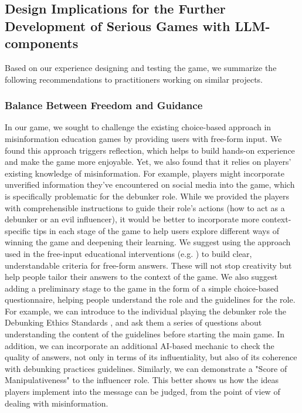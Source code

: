 
\subsection{Design Implications for the Further Development of Serious Games with LLM-components}
Based on our experience designing and testing the game, we summarize the following recommendations to practitioners working on similar projects.

\subsubsection {Balance Between Freedom and Guidance}
In our game, we sought to challenge the existing choice-based approach in misinformation education games by providing users with free-form input. We found this approach triggers reflection, which helps to build hands-on experience and make the game more enjoyable. Yet, we also found that it relies on players’ existing knowledge of misinformation. For example, players might incorporate unverified information they’ve encountered on social media into the game, which is specifically problematic for the debunker role. While we provided the players with comprehensible instructions to guide their role's actions (how to act as a debunker or an evil influencer), it would be better to incorporate more context-specific tips in each stage of the game to help users explore different ways of winning the game and deepening their learning. We suggest using the approach used in the free-input educational interventions (e.g. \cite{bryfczynski2012besocratic}) to build clear, understandable criteria for free-form answers. These will not stop creativity but help people tailor their answers to the context of the game. We also suggest adding a preliminary stage to the game in the form of a simple choice-based questionnaire, helping people understand the role and the guidelines for the role. For example, we can introduce to the individual playing the debunker role the Debunking Ethics Standards  \cite{edmo2024,afp2024,eeas2024}, and ask them a series of questions about understanding the content of the guidelines before starting the main game. In addition, we can incorporate an additional AI-based mechanic to check the quality of answers, not only in terms of its influentiality, but also of its coherence with debunking practices guidelines. Similarly, we can demonstrate a "Score of Manipulativeness" to the influencer role. This better shows us how the ideas players implement into the message can be judged, from the point of view of dealing with misinformation.
